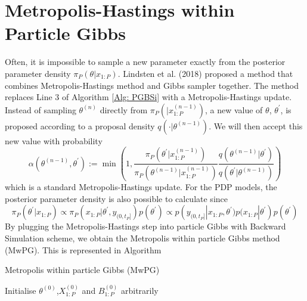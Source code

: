 \documentclass[12pt,a4paper]{article}
\begin{document}
\section{Metropolis-Hastings within Particle Gibbs}
Often, it is impossible to sample a new parameter exactly from the posterior parameter density $\pi_P\left(\theta|x_{1:P}\right)$. Lindsten et al. (2018) proposed a method that combines Metropolis-Hastings method and Gibbs sampler together. The method replaces Line 3 of Algorithm \ref{Alg: PGBSi} with a Metropolis-Hastings update. Instead of sampling $\theta^{(n)}$ directly from $\pi_P\left(|x_{1:P}^{(n-1)}\right)$, a new value of $\theta$, $\theta^{'}$, is proposed according to a proposal density $q\left(\cdot|\theta^{(n-1)}\right)$. We will then accept this new value with probability 
\begin{equation}
    \label{AcceptanceRate}
    \alpha\left(\theta^{(n-1)},\theta^{'}\right) := \min \left(1,\frac{\pi_{P}\left(\theta^{'}|x_{1:P}^{(n-1)}\right)}{\pi_P\left(\theta^{(n-1)}|x_{1:P}^{(n-1)}\right)}\frac{q\left(\theta^{(n-1)}|\theta^{'}\right)}{q\left(\theta^{'}|\theta^{(n-1)}\right)}\right)
\end{equation}
which is a standard Metropolis-Hastings update. For the PDP models, the posterior parameter density is also possible to calculate since 
$$\pi_P\left(\theta^{'}|x_{1:P}\right) \propto \pi_P\left(x_{1:P}|\theta^{'},y_{(0,t_P]}\right)p\left(\theta^{'}\right)\propto p\left(y_{(0,t_P]}|x_{1:P},\theta^{'})p(x_{1:P}|\theta^{'}\right)p\left(\theta^{'}\right)$$
By plugging the Metropolis-Hastings step into particle Gibbs with Backward Simulation scheme, we obtain the Metropolis within particle Gibbs method (MwPG). This is represented in Algorithm
\begin{algorithm}[htb!]
    \caption{Metropolis within particle Gibbs (MwPG)}
        Initialise $\theta^{(0)}$,$X_{1:P}^{(0)}$ and $B_{1:P}^{(0)}$ arbitrarily\;
    \label{Alg:Metropolis within PG}
\end{algorithm}
\end{document}
